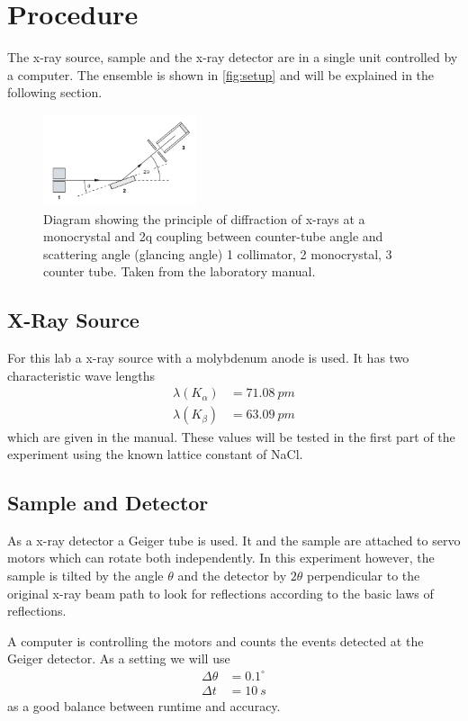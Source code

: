 \section{Procedure}
\label{sec:procedure}
The x-ray source, sample and the x-ray detector are in a single unit controlled by a computer. The
ensemble is shown in \autoref{fig:setup} and will be explained in the following section.

\begin{figure}
  \centering
  \includegraphics[width=0.4\textwidth]{media/setup.png}
  \caption{Diagram showing the principle of diffraction of x-rays at a
monocrystal and 2q coupling between counter-tube angle
and scattering angle (glancing angle)
1 collimator, 2 monocrystal, 3 counter tube. Taken from the laboratory manual.}
  \label{fig:setup}
\end{figure}

\subsection{X-Ray Source}
\label{sec:X-Ray Source}
For this lab a x-ray source with a molybdenum anode is used. It has two characteristic wave lengths 
\begin{align*}
  \lambda (K_\alpha) &= \SI{71.08}{pm} \\
  \lambda (K_\beta) &= \SI{63.09}{pm}
\end{align*}
which are given in the manual. These values will be tested in the first part of the experiment using
the known lattice constant of NaCl.

\subsection{Sample and Detector}
\label{sec:Sample and Detector}
As a x-ray detector a Geiger tube is used. It and the sample are attached to servo motors which can
rotate both independently. In this experiment however, the sample is tilted by the angle $\theta$
and the detector by $2\theta$ perpendicular to the original x-ray beam path to look for reflections
according to the basic laws of reflections.

A computer is controlling the motors and counts the events detected at the Geiger detector. As a
setting we will use
\begin{align*}
  \Delta \theta &= 0.1^\circ \\
  \Delta t &= \SI{10}{s}
\end{align*}
as a good balance between runtime and accuracy.

